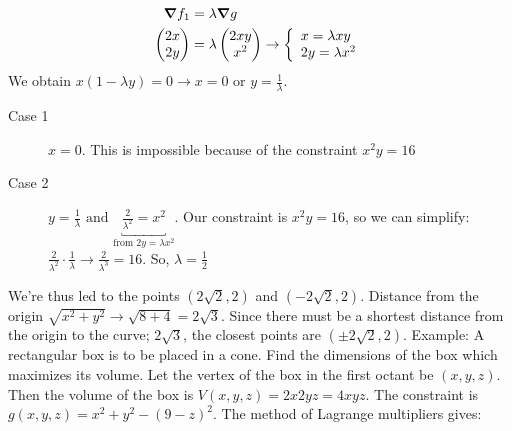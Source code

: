 \documentclass{article}
\newcommand{\n}{\leavevmode \newline} %
\newcommand{\nn}{\leavevmode \newline \newline} %
\numberwithin{equation}{subsection} %
\begin{document}
\begin{equation}
    \begin{split}
        \grad f_1 &= \lambda \grad g \\
        \begin{pmatrix}
            2x \\ 2y
        \end{pmatrix}
        &= \lambda
        \begin{pmatrix}
            2xy \\ x^2
        \end{pmatrix}
        \to
        \left\{
        \begin{array}{ll}
            x=\lambda xy\\
            2y=\lambda x^2
        \end{array}
        \right.
    \end{split}
\end{equation}
\n
We obtain $x(1-\lambda y) = 0 \to x=0 \text{ or } y=\frac{1}{\lambda}$.
\begin{description}
    \item[Case 1] $x=0$. This is impossible because of the constraint $x^2y=16$
    \item[Case 2] $y=\frac{1}{\lambda} \text{ and } \underbracket{\frac{2}{\lambda^2}=x^2}_{\text{from }2y=\lambda x^2}$. Our constraint is $x^2y=16$, so we can simplify: $\frac{2}{\lambda^2}\cdot \frac{1}{\lambda}\to\frac{2}{\lambda^3}=16$. So, $\lambda = \frac{1}{2}$
\end{description}
We're thus led to the points $(2\sqrt{2},2)$ and $(-2\sqrt{2},2)$. Distance from the origin $\sqrt{x^2+y^2} \to \sqrt{8+4} = 2\sqrt{3}$. Since there must be a shortest distance from the origin to the curve; $2\sqrt{3}$, the closest points are $(\pm2\sqrt{2},2)$.
\nn
Example: A rectangular box is to be placed in a cone. Find the dimensions of the box which maximizes its volume. Let the vertex of the box in the first octant be $(x,y,z)$. Then the volume of the box is $V(x,y,z)=2x2yz = 4xyz$. The constraint is $g(x,y,z)=x^2+y^2 - (9-z)^2$. The method of Lagrange multipliers gives: 
\end{document}
